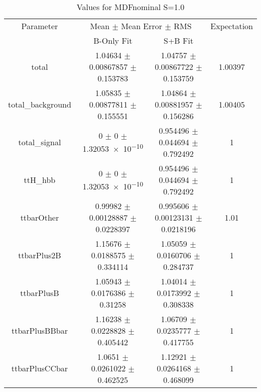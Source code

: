 \begin{table}
\centering
\caption{Values for MDFnominal S=1.0}
\begin{tabular}{cccc}
\toprule
Parameter & \multicolumn{2}{c}{Mean $\pm$ Mean Error $\pm$ RMS} & Expectation\\
 & B-Only Fit & S+B Fit & \\
\midrule
total & \num{1.04634} $\pm$ \num{0.00867857} $\pm$ \num{0.153783} & \num{1.04757} $\pm$ \num{0.00867722} $\pm$ \num{0.153759} & \num{1.00397}\\
total\_background & \num{1.05835} $\pm$ \num{0.00877811} $\pm$ \num{0.155551} & \num{1.04864} $\pm$ \num{0.00881957} $\pm$ \num{0.156286} & \num{1.00405}\\
total\_signal & \num{0} $\pm$ \num{0} $\pm$ \num{1.32053e-10} & \num{0.954496} $\pm$ \num{0.044694} $\pm$ \num{0.792492} & \num{1}\\
ttH\_hbb & \num{0} $\pm$ \num{0} $\pm$ \num{1.32053e-10} & \num{0.954496} $\pm$ \num{0.044694} $\pm$ \num{0.792492} & \num{1}\\
ttbarOther & \num{0.99982} $\pm$ \num{0.00128887} $\pm$ \num{0.0228397} & \num{0.995606} $\pm$ \num{0.00123131} $\pm$ \num{0.0218196} & \num{1.01}\\
ttbarPlus2B & \num{1.15676} $\pm$ \num{0.0188575} $\pm$ \num{0.334114} & \num{1.05059} $\pm$ \num{0.0160706} $\pm$ \num{0.284737} & \num{1}\\
ttbarPlusB & \num{1.05943} $\pm$ \num{0.0176386} $\pm$ \num{0.31258} & \num{1.04014} $\pm$ \num{0.0173992} $\pm$ \num{0.308338} & \num{1}\\
ttbarPlusBBbar & \num{1.16238} $\pm$ \num{0.0228828} $\pm$ \num{0.405442} & \num{1.06709} $\pm$ \num{0.0235777} $\pm$ \num{0.417755} & \num{1}\\
ttbarPlusCCbar & \num{1.0651} $\pm$ \num{0.0261022} $\pm$ \num{0.462525} & \num{1.12921} $\pm$ \num{0.0264168} $\pm$ \num{0.468099} & \num{1}\\
\bottomrule
\end{tabular}
\end{table}